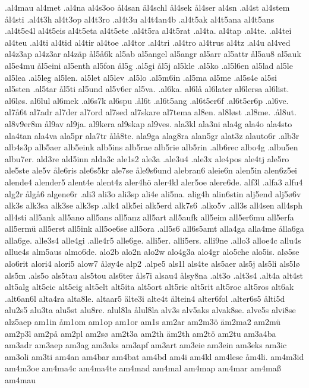 .al4mau
al4met
.al4na
al4s3oo
ål4san
äl4schl
ål4sek
ål4ser
al4sn
.al4st
al4stem
ål4sti
.al4t3h
al4t3op
al4t3ro
.al4t3u
al4t4an4b
.al4t5ak
al4t5ana
al4t5ans
.al4t5e4l
al4t5eis
al4t5eta
al4t5ete
.al4t5ra
al4t5rat
.al4ta.
al4tap
.al4te.
.al4tei
al4teu
.al4ti
al4tid
al4tir
al4toe
.al4tor
.al4tri
.al4tro
al4trus
al4tz
.al4u
al4ved
al4z3ap
al4z3ar
al4zäp
ål5å6k
al5ab
al5angel
al5angr
al5arr
al5attr
ål5au8
al5auk
al5e4mu
ål5eini
al5enth
al5fon
ål5g
.al5gi
ål5j
al5kle
.al5ko
.al5l6en
al5lad
al5le
al5lea
.al5leg
al5len.
al5let
al5lev
.al5lo
.al5m6in
.al5ma
al5me
.al5s4e
al5si
al5sten
.al5tar
ål5ti
al5und
al5v6er
al5va.
.al6ka.
al6lå
al6later
al6lersa
al6list.
al6løs.
al6lul
al6mek
.al6s7k
al6spu
.ål6t
.al6t5ang
.al6t5er6f
.al6t5er6p
.al6ve.
al7å6t
al7adr
al7der
al7ord
al7sed
al7skare
al7tema
al8en.
al8løst
.al8me.
.ål8ut.
al8v9er8m
ål9av
al9ja.
al9kera
al9skap
al9ves.
ala3kl
ala3ni
ala4g
ala4o
ala4sto
ala4tan
ala4va
ala5pr
ala7tr
ålå8te.
ala9ga
alag8ra
alan5gr
alat3z
alauto6r
.alb3r
alb4s3p
alb5aer
alb5eink
alb5ins
alb5rae
alb5rie
alb5rin
.alb6rec
albo4g
.albu5en
albu7er.
ald3re
ald5inn
alda3c
ale1s2
ale3a
.ale3u4
.ale3x
ale4pos
ale4tj
ale5ro
ale5ste
ale5v
åle6ris
ale6s5kr
ale7se
åle9s6und
alebran6
aleie6n
alen5in
alen6z5ei
alende4
alender5
alent4e
alent4z
aler4hö
aler4kl
aler5oe
alere6de.
alf3l
.alfa3
alfu4
alg2r
ålgå6
algene6r
.ali3
ali3o
ali3sp
ali4e
ali5na.
alig4h
alin6stin
alj5end
alj5ø6v
alk3s
alk3sa
alk3se
alk3sp
.alk4
alk5ei
alk5erd
alk7s6
.alko5v
.all3s
all4sen
all4sph
all4sti
all5ank
all5ano
all5ans
all5anz
all5art
all5aufk
all5eim
all5er6mu
all5erfa
all5ermü
all5erst
all5ink
all5oe6se
all5ora
.all5s6
all6s5amt
alla4ga
alla4me
ålla6ga
alla6ge.
alle3s4
alle4gi
.alle4r5
alle6ge.
alli5er.
alli5ers.
alli9ne
.allo3
alloe4c
allu4s
allue4s
alm5aus
almo6de.
alo2b
alo2n
alo2w
alo4g3a
alo4gr
alo5che
alo5is.
alø5se
alo6rit
alori4
alori5
alow7
åløy4e
alp2
.alpe5
als1l
als4te
als5aer
als5j
als5li
als5lø
als5m
.als5o
als5tau
als5tou
als6ter
åls7i
alsau4
ålsy8na
.alt3o
.alt3s4
.alt4a
alt4st
alt5alg
alt5eic
alt5eig
alt5elt
alt5ita
alt5ort
alt5ric
alt5rit
alt5roc
alt5ros
alt6ak
.alt6an6l
alta4ra
alta8le.
altaar5
älte3i
alte4t
ältein4
alter6fol
.alter6s5
ålti5d
alu2s5
alu3ta
alu5st
alu8re.
alul8la
ålul8la
alv3s
alv5aks
alvak8se.
alve5s
alvi8se
alz5aep
am1in
åm1om
am1op
am1or
am1s
am2ar
am2m3ö
äm2ma2
am2mü
am2p3l
am2på
am2pl
am2sø
am2t3a
am2th
äm2th
am2tö
am2tu
am3a4ba
am3adr
am3aep
am3ag
am3aks
am3apf
am3art
am3eie
am3ein
am3eks
am3ic
am3oli
am3ti
am4an
am4bar
am4bat
am4bd
am4i
am4kl
am4lese
åm4li.
am4m3id
am4m3oe
am4ma4c
am4ma4te
am4mad
am4mal
am4map
am4mar
am4maß
am4mau
